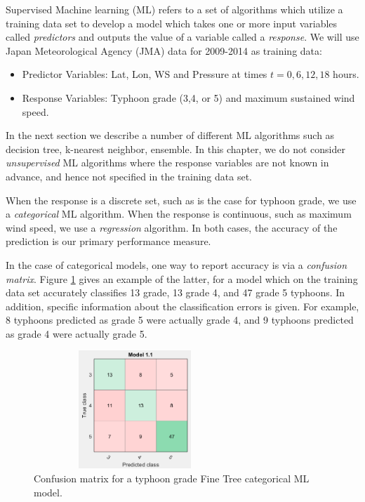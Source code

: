 \documentclass{SBCbookchapter}
\begin{document}
Supervised Machine learning (ML) refers to a set of algorithms which utilize a training data set to develop a model which takes one or more input variables called \emph{predictors} and outputs the value of a variable called a \emph{response}. We will use Japan Meteorological Agency (JMA) data for 2009-2014 as training data:

\begin{itemize}
	\item Predictor Variables: Lat, Lon, WS and Pressure at times $t=0,6,12,18$ hours.
	\item Response Variables: Typhoon grade (3,4, or 5) and maximum sustained wind speed.
\end{itemize}

 {\flushleft In the} next section we describe a number of different ML algorithms such as decision tree, k-nearest neighbor, ensemble. In this chapter, we do not consider \emph{unsupervised} ML algorithms where the response variables are not known in advance, and hence not specified in the training data set.



 When the response is a discrete set, such as is the case for typhoon grade, we use a \emph{categorical} ML algorithm. When the response is continuous, such as maximum wind speed, we use a \emph{regression} algorithm.  In both cases, the accuracy of the prediction is our primary performance measure.  
 
 In the case of categorical models, one way to report accuracy is via a \emph{confusion matrix}. Figure \ref{FineTreeCategorical} gives an example of the latter, for a model which on the training data set accurately classifies 13 grade, 13 grade 4, and 47 grade 5 typhoons. In addition, specific information about the classification errors is given.  For example, 8 typhoons predicted as grade 5 were actually grade 4, and 9 typhoons predicted as grade 4 were actually grade 5. 
 
  \begin{figure}[!htpb]
  	\centering
  	\includegraphics[width=3in,height=1.75in]{TyphoonCM1.png}
  	\caption{Confusion matrix for a typhoon grade Fine Tree categorical ML model.}
  	\label{FineTreeCategorical}
  \end{figure}
  
\end{document}
